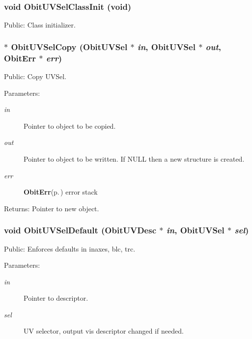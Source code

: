 \subsubsection{\setlength{\rightskip}{0pt plus 5cm}void Obit\-UVSel\-Class\-Init (void)}\label{ObitUVSel_8h_a3}


Public: Class initializer. 

\subsubsection{$\ast$ Obit\-UVSel\-Copy ({\bf Obit\-UVSel} $\ast$ {\em in}, {\bf Obit\-UVSel} $\ast$ {\em out}, {\bf Obit\-Err} $\ast$ {\em err})}\label{ObitUVSel_8h_a6}


Public: Copy UVSel. 

\begin{Desc}
\item[Parameters:]
\begin{description}
\item[{\em in}]Pointer to object to be copied. \item[{\em out}]Pointer to object to be written. If NULL then a new structure is created. \item[{\em err}]{\bf Obit\-Err}{\rm (p.\,\pageref{structObitErr})} error stack \end{description}
\end{Desc}
\begin{Desc}
\item[Returns:]Pointer to new object. \end{Desc}
\subsubsection{\setlength{\rightskip}{0pt plus 5cm}void Obit\-UVSel\-Default ({\bf Obit\-UVDesc} $\ast$ {\em in}, {\bf Obit\-UVSel} $\ast$ {\em sel})}\label{ObitUVSel_8h_a8}


Public: Enforces defaults in inaxes, blc, trc. 

\begin{Desc}
\item[Parameters:]
\begin{description}
\item[{\em in}]Pointer to descriptor. \item[{\em sel}]UV selector, output vis descriptor changed if needed. \end{description}
\end{Desc}
